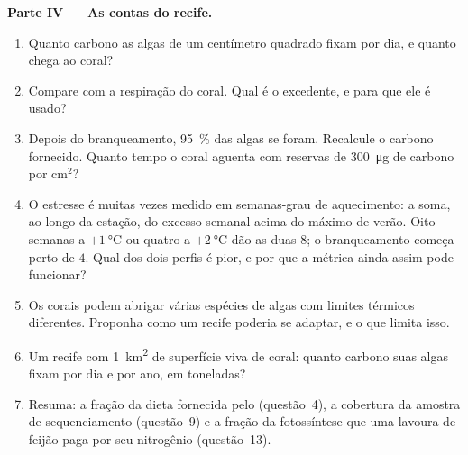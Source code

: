 \begin{problem}
\medskip
\noindent\textbf{Parte IV --- As contas do recife.}
\begin{enumerate}[resume]
  \item Quanto carbono as algas de um centímetro quadrado fixam por
        dia, e quanto chega ao coral?
  \item Compare com a respiração do coral. Qual é o excedente, e para
        que ele é usado?
  \item Depois do branqueamento, \qty{95}{\%} das algas se foram.
        Recalcule o carbono fornecido. Quanto tempo o coral aguenta com
        reservas de \qty{300}{\micro g} de carbono por cm$^{2}$?
  \item O estresse é muitas vezes medido em semanas-grau de
        aquecimento: a soma, ao longo da estação, do excesso semanal
        acima do máximo de verão. Oito semanas a
        $+\qty{1}{\celsius}$ ou quatro a $+\qty{2}{\celsius}$ dão as
        duas $8$; o branqueamento começa perto de $4$. Qual dos dois
        perfis é pior, e por que a métrica ainda assim pode funcionar?
  \item Os corais podem abrigar várias espécies de algas com limites
        térmicos diferentes. Proponha como um recife poderia se adaptar,
        e o que limita isso.
  \item Um recife com \qty{1}{km^2} de superfície viva de coral: quanto
        carbono suas algas fixam por dia e por ano, em toneladas?
  \item Resuma: a fração da dieta fornecida pelo 
        (questão~4), a cobertura da amostra de sequenciamento
        (questão~9) e a fração da fotossíntese que uma lavoura de
        feijão paga por seu nitrogênio (questão~13).
\end{enumerate}
\end{problem}
